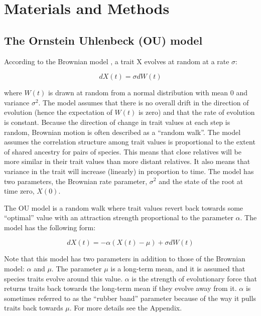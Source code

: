 \documentclass[a4paper,12pt]{article}
\begin{document}
\section{Materials and Methods}
  \subsection{The Ornstein Uhlenbeck (OU) model}
    According to the Brownian model \citep{cavalli1967,felsenstein1973maximum}, a trait X evolves at random at a rate $\sigma$:

      \begin{equation}
        dX(t) = \sigma dW(t)
      \end{equation}

    where $W(t)$ is drawn at random from a normal distribution with mean $0$ and variance $\sigma^2$. 
    The model assumes that there is no overall drift in the direction of evolution (hence the expectation of $W(t)$ is zero) and that the rate of evolution is constant. 
    Because the direction of change in trait values at each step is random, Brownian motion is often described as a ``random walk''.
    The model assumes the correlation structure among trait values is proportional to the extent of shared ancestry for pairs of species. 
    This means that close relatives will be more similar in their trait values than more distant relatives. It also means that variance in the trait will increase (linearly) in proportion to time. 
    The model has two parameters, the Brownian rate parameter, $\sigma^2$ and the state of the root at time zero, $X(0)$. 

    The OU model \citep{hansen1997stabilizing,Butler:2004aa} is a random walk where trait values revert back towards some ``optimal'' value with an attraction strength proportional to the parameter $\alpha$. 
    The model has the following form:
  
      \begin{equation}
        dX(t) = - \alpha (X(t) - \mu) + \sigma dW(t)
      \end{equation}

    Note that this model has two parameters in addition to those of the Brownian model: $\alpha$ and $\mu$. 
    The parameter $\mu$ is a long-term mean, and it is assumed that species traits evolve around this value. 
    $\alpha$ is the strength of evolutionary force that returns traits back towards the long-term mean if they evolve away from it. 
    $\alpha$ is sometimes referred to as the ``rubber band'' parameter because of the way it pulls traits back towards $\mu$. For more details see the Appendix.
    
\end{document}
